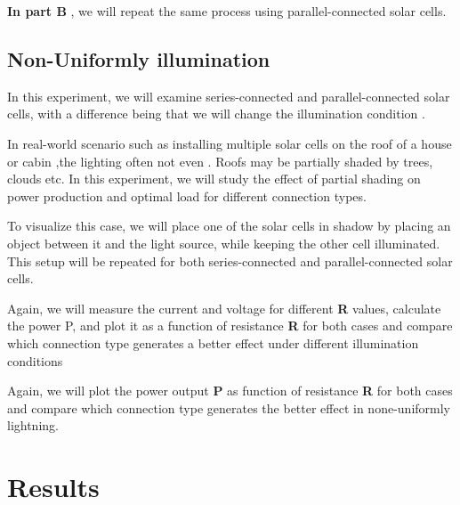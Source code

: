 \documentclass[12pt]{article}
\begin{document}
\textbf{In part B} , we will repeat the same process using parallel-connected solar cells.

\subsection{Non-Uniformly illumination}

In this experiment, we will examine series-connected and parallel-connected solar cells, with a difference being that we will change the illumination condition .

In real-world scenario such as installing multiple solar cells on the roof of a house or cabin ,the lighting  often not even . Roofs may be partially shaded by trees, clouds etc. In this experiment, we will  study the effect of partial shading on power production  and optimal load for different connection types.

To visualize  this case, we will place one of the solar cells in  shadow by placing an object between it and the  light source, while keeping the other cell   illuminated.
This setup will be repeated for both series-connected and parallel-connected solar cells.

Again, we will measure the current and voltage for different \textbf{R} values, calculate the power  
P, and plot it as a function of resistance \textbf{R} for both cases and compare which connection type generates a better effect under different illumination conditions



Again, we will plot the power output \textbf{P} as function of  resistance \textbf{R} for both cases and compare which connection type generates the better effect in none-uniformly lightning.

\section{Results}
\end{document}
